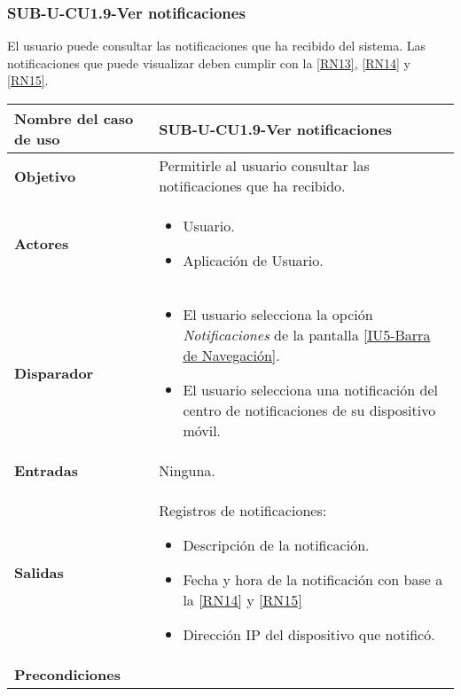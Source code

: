 
\subsubsection{SUB-U-CU1.9-Ver notificaciones}\label{SUB-U-CU1.9}
El usuario puede consultar las notificaciones que ha recibido del sistema. Las notificaciones que puede visualizar deben cumplir con la \ref{RN13}, \ref{RN14} y \ref{RN15}.

\begin{longtable}{|J{5cm}|J{10.3cm}|}
	\hline
	\textbf{Nombre del caso de uso} &
		SUB-U-CU1.9-Ver notificaciones \\ \hline
	\textbf{Objetivo} &
		Permitirle al usuario consultar las notificaciones que ha recibido. \\ \hline
	\textbf{Actores} &
	    \begin{itemize}
		    \item Usuario. 
		    \item Aplicación de Usuario.
		\end{itemize}
		    \\ \hline 
	\textbf{Disparador} & 
		\begin{itemize}
		    \item El usuario selecciona la opción \textit{Notificaciones} de la pantalla \hyperref[fig:Barra de navegacion]{[IU5-Barra de Navegación]}.
		    \item El usuario selecciona una notificación del centro de notificaciones de su dispositivo móvil.
		 \end{itemize}
		 \\ \hline 
	\textbf{Entradas} & Ninguna.
		\\ \hline 
	\textbf{Salidas} & 
	    Registros de notificaciones:
		\begin{itemize}
			\item Descripción de la notificación.
			\item Fecha y hora de la notificación con base a la \ref{RN14} y \ref{RN15}
			\item Dirección IP del dispositivo que notificó.
		\end{itemize} 
		\\ \hline
	\textbf{Precondiciones} &
	    \begin{itemize}

\end{itemize}
\end{longtable}
